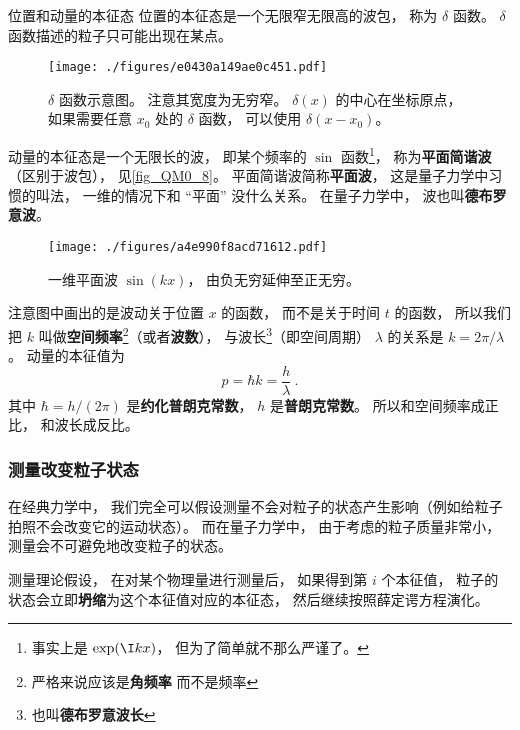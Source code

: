 \begin{example}{位置和动量的本征态}
位置的本征态是一个无限窄无限高的波包， 称为 $\delta$ 函数。 $\delta$ 函数描述的粒子只可能出现在某点。 
\begin{figure}[ht]
\centering
\texttt{[image: ./figures/e0430a149ae0c451.pdf]}
\caption{$\delta$ 函数示意图。 注意其宽度为无穷窄。 $\delta(x)$ 的中心在坐标原点， 如果需要任意 $x_0$ 处的 $\delta$ 函数， 可以使用 $\delta(x - x_0)$。} \label{fig_QM0_9} %
\end{figure}

动量的本征态是一个无限长的波， 即某个频率的 $\sin$ 函数\footnote{事实上是 $\exp(\I kx)$， 但为了简单就不那么严谨了。}， 称为\textbf{平面简谐波}（区别于波包）， 见\autoref{fig_QM0_8}。 平面简谐波简称\textbf{平面波}， 这是量子力学中习惯的叫法， 一维的情况下和 “平面” 没什么关系。 在量子力学中， 波也叫\textbf{德布罗意波}。

\begin{figure}[ht]
\centering
\texttt{[image: ./figures/a4e990f8acd71612.pdf]}
\caption{一维平面波 $\sin(kx)$， 由负无穷延伸至正无穷。} \label{fig_QM0_8}
\end{figure}

注意图中画出的是波动关于位置 $x$ 的函数， 而不是关于时间 $t$ 的函数， 所以我们把 $k$ 叫做\textbf{空间频率}\footnote{严格来说应该是\textbf{角频率} 而不是频率}（或者\textbf{波数}）， %
与波长\footnote{也叫\textbf{德布罗意波长}}（即空间周期） $\lambda$ 的关系是 $k = 2\pi/\lambda$。 动量的本征值为
\begin{equation}\label{eq_QM0_1}
p = \hbar k = \frac{h}{\lambda}~.
\end{equation}
其中 $\hbar = h / (2\pi)$ 是\textbf{约化普朗克常数}， $h$ 是\textbf{普朗克常数}。 所以和空间频率成正比， 和波长成反比。
\end{example}

\subsubsection{测量改变粒子状态}
在经典力学中， 我们完全可以假设测量不会对粒子的状态产生影响（例如给粒子拍照不会改变它的运动状态）。 而在量子力学中， 由于考虑的粒子质量非常小， 测量会不可避免地改变粒子的状态。

测量理论假设， 在对某个物理量进行测量后， 如果得到第 $i$ 个本征值， 粒子的状态会立即\textbf{坍缩}为这个本征值对应的本征态， 然后继续按照薛定谔方程演化。

